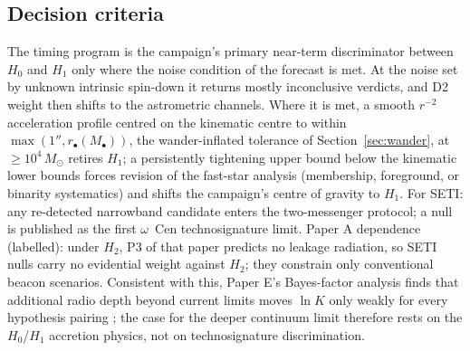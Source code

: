 \documentclass[11pt]{article}
\newcommand{\msun}{\ensuremath{M_\odot}}
\newcommand{\ocen}{\ensuremath{\omega}~Cen}
\begin{document}
\subsection{Decision criteria}

The timing program is the campaign's primary near-term discriminator between $H_0$ and $H_1$ only where the noise condition of the forecast is met. At the noise set by unknown intrinsic spin-down it returns mostly inconclusive verdicts, and D2 weight then shifts to the astrometric channels. Where it is met, a smooth $r^{-2}$ acceleration profile centred on the kinematic centre to within $\max(1'', r_{\bullet}(M_{\bullet}))$, the wander-inflated tolerance of Section~\ref{sec:wander}, at $\geq 10^{4}\,\msun$ retires $H_1$; a persistently tightening upper bound below the kinematic lower bounds forces revision of the fast-star analysis (membership, foreground, or binarity systematics) and shifts the campaign's centre of gravity to $H_1$. For SETI: any re-detected narrowband candidate enters the two-messenger protocol; a null is published as the first \ocen{} technosignature limit. Paper A dependence (labelled): under $H_2$, P3 of that paper predicts no leakage radiation, so SETI nulls carry no evidential weight against $H_2$; they constrain only conventional beacon scenarios. Consistent with this, Paper E's Bayes-factor analysis finds that additional radio depth beyond current limits moves $\ln K$ only weakly for every hypothesis pairing \citep{Swanson2026Engineered}; the case for the deeper continuum limit therefore rests on the $H_0$/$H_1$ accretion physics, not on technosignature discrimination.
\end{document}
